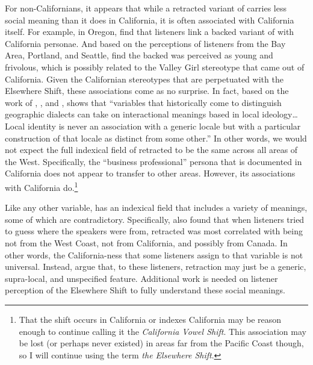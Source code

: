 For non-Californians, it appears that while a retracted variant of \bat carries less social meaning than it does in California, it is often associated with California itself. For example, in Oregon, \citet{adcock_becker_2016} find that listeners link a backed variant of \bat with California personae. And based on the perceptions of listeners from the Bay Area, Portland, and Seattle, \citet{becker_swan_2019} find the backed \bat was perceived as young and frivolous, which is possibly related to the Valley Girl stereotype that came out of California. Given the Californian stereotypes that are perpetuated with the Elsewhere Shift, these associations come as no surprise. In fact, based on the work of \citet{labov_1963}, \citet{eckert_2000}, and \citet{zhang_2005}, \citet[462]{eckert_2008_indexicalFields} shows that ``variables that historically come to distinguish geographic dialects can take on interactional meanings based in local ideology\ldots Local identity is never an association with a generic locale but with a particular construction of that locale as distinct from some other.'' In other words, we would not expect the full indexical field of retracted \bat to be the same across all areas of the West. Specifically, the ``business professional'' persona that is documented in California does not appear to transfer to other areas. However, its associations with California do.\footnote{That the shift occurs in California or indexes California may be reason enough to continue calling it the \textit{California Vowel Shift}. This association may be lost (or perhaps never existed) in areas far from the Pacific Coast though, so I will continue using the term \textit{the Elsewhere Shift}.}

Like any other variable, \bat has an indexical field that includes a variety of meanings, some of which are contradictory. Specifically, \citet{becker_swan_2019} also found that when listeners tried to guess where the speakers were from, retracted \bat was most correlated with being not from the West Coast, not from California, and possibly from Canada. In other words, the California-ness that some listeners assign to that variable is not universal. Instead, \citeauthor{becker_swan_2019} argue that, to these listeners, \bat retraction may just be a generic, supra-local, and unspecified feature. Additional work is needed on listener perception of the Elsewhere Shift to fully understand these social meanings.

